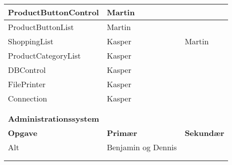 \begin{table}[H]
\begin{tabular}{lll}
		\multicolumn{1}{|l|}{ProductButtonControl}         & \multicolumn{1}{l|}{Martin}                                  & \multicolumn{1}{l|}{}                  \\ \hline
		
		\multicolumn{1}{|l|}{ProductButtonList}         & \multicolumn{1}{l|}{Martin}                                  & \multicolumn{1}{l|}{}                  \\ \hline
		
		\multicolumn{1}{|l|}{ShoppingList}         & \multicolumn{1}{l|}{Kasper}                                  & \multicolumn{1}{l|}{Martin}                  \\ \hline
		
		\multicolumn{1}{|l|}{ProductCategoryList}         & \multicolumn{1}{l|}{Kasper}                                  & \multicolumn{1}{l|}{}                  \\ \hline
		
		\multicolumn{1}{|l|}{DBControl}         & \multicolumn{1}{l|}{Kasper}                                  & \multicolumn{1}{l|}{}                  \\ \hline
		
		\multicolumn{1}{|l|}{FilePrinter}         & \multicolumn{1}{l|}{Kasper}                                  & \multicolumn{1}{l|}{}                  \\ \hline
		
		\multicolumn{1}{|l|}{Connection}         & \multicolumn{1}{l|}{Kasper}                                  & \multicolumn{1}{l|}{}                  \\ \hline
		
		& & \\& & \\ \hline                                           
		
		
		\multicolumn{3}{|l|}{\color{lblue} \textbf{Administrationssystem}}                                                                                                               \\ \hline
		\multicolumn{1}{|l|}{\textbf{Opgave}}           & \multicolumn{1}{l|}{\textbf{Primær}}                       & \multicolumn{1}{l|}{\textbf{Sekundær}} \\ \hline
		\multicolumn{1}{|l|}{Alt}         & \multicolumn{1}{l|}{Benjamin og Dennis}                                  & \multicolumn{1}{l|}{}                  \\ \hline
		& & \\& & \\ \hline 
		

\end{tabular}
\end{table}
